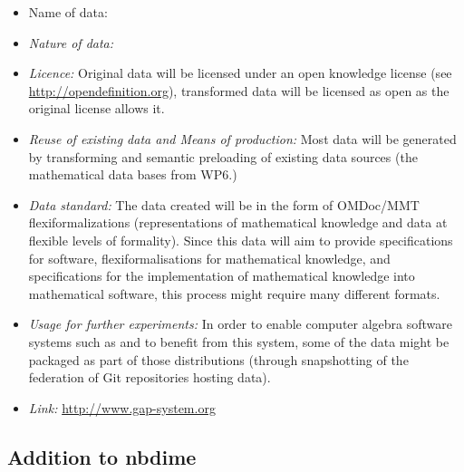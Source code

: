 \documentclass{../../Proposal/LaTeX-proposal/deliverablereport}
\begin{document}
\begin{itemize}
\item{Name of data:}
\item\textit{Nature of data:}
\item\textit{Licence:} Original data will be licensed under an open knowledge license (see \url{http://opendefinition.org}), transformed data will be licensed as open as the original license allows it.
\item\textit{Reuse of existing data and Means of production:} Most data will be generated by transforming and semantic preloading of existing data sources (the mathematical data bases from WP6.)
\item\textit{Data standard:} The data created will be in the form of OMDoc/MMT flexiformalizations (representations of mathematical knowledge and data at flexible levels of formality). Since this data will aim to provide specifications for software, flexiformalisations for mathematical knowledge, and specifications for the implementation of mathematical knowledge into mathematical software, this process might require many different formats.
\item\textit{Usage for further experiments:} In order to enable computer algebra software systems such as \Sage and \GAP to benefit from this system, some of the data might be packaged as part of those distributions (through snapshotting of the federation of Git repositories hosting data).
\item\textit{Link:} \href{http://www.gap-system.org}{http://www.gap-system.org}
\end{itemize}


\subsection{Addition to nbdime}
\end{document}

